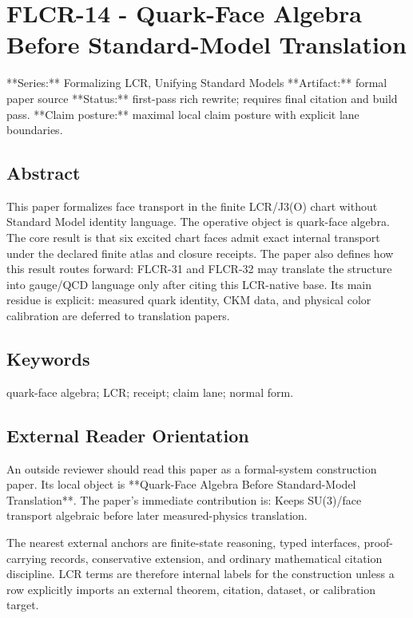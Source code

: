 \documentclass[11pt]{article}
\begin{document}
\section*{FLCR-14 - Quark-Face Algebra Before Standard-Model Translation}

**Series:** Formalizing LCR, Unifying Standard Models
**Artifact:** formal paper source
**Status:** first-pass rich rewrite; requires final citation and build pass.
**Claim posture:** maximal local claim posture with explicit lane boundaries.

\subsection*{Abstract}

This paper formalizes face transport in the finite LCR/J3(O) chart without Standard Model identity language. The operative object is quark-face algebra. The core result is that six excited chart faces admit exact internal transport under the declared finite atlas and closure receipts. The paper also defines how this result routes forward: FLCR-31 and FLCR-32 may translate the structure into gauge/QCD language only after citing this LCR-native base. Its main residue is explicit: measured quark identity, CKM data, and physical color calibration are deferred to translation papers.

\subsection*{Keywords}

quark-face algebra; LCR; receipt; claim lane; normal form.

\subsection*{External Reader Orientation}

An outside reviewer should read this paper as a formal-system construction paper. Its local object is **Quark-Face Algebra Before Standard-Model Translation**. The paper's immediate contribution is: Keeps SU(3)/face transport algebraic before later measured-physics translation.

The nearest external anchors are finite-state reasoning, typed interfaces, proof-carrying records, conservative extension, and ordinary mathematical citation discipline. LCR terms are therefore internal labels for the construction unless a row explicitly imports an external theorem, citation, dataset, or calibration target.
\end{document}
